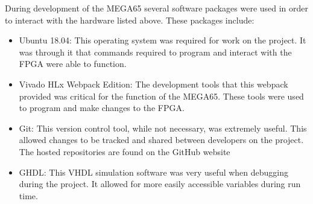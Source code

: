\label{Ch3 Sec2 Sub2}

During development of the MEGA65 several software packages were used in order to interact with the hardware listed above. These packages include:\\

\begin{itemize}
\item{Ubuntu 18.04: This operating system was required for work on the project. It was through it that commands required to program and interact with the FPGA were able to function.}
\item{Vivado HLx Webpack Edition: The development tools that this webpack provided was critical for the function of the MEGA65. These tools were used to program and make changes to the FPGA.}
\item{Git: This version control tool, while not necessary, was extremely useful. This allowed changes to be tracked and shared between developers on the project. The hosted repositories are found on the GitHub website}
\item{GHDL: This VHDL simulation software was very useful when debugging during the project. It allowed for more easily accessible variables during run time.}
\end{itemize}
